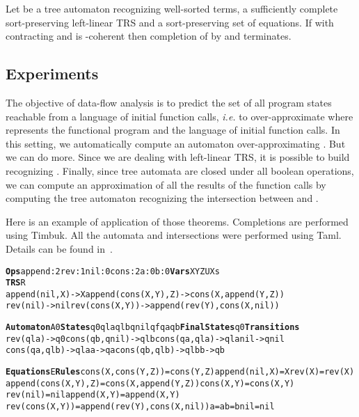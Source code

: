\documentclass[a4paper,11pt]{llncs}
\newcommand{\timbuk}{{\sf Timbuk}}
\def\timFont{\bf}
\newcommand{\Ops}{{\timFont Ops}}
\newcommand{\Vars}{{\timFont Vars}}
\newcommand{\TRS}{{\timFont TRS}}
\newcommand{\Automaton}{{\timFont Automaton}}
\newcommand{\States}{{\timFont States}}
\newcommand{\FinalStates}{{\timFont Final States}}
\newcommand{\Transitions}{{\timFont Transitions}}
\newcommand{\Equations}{{\timFont Equations}}
\newcommand{\Rules}{{\timFont Rules}}
\theoremstyle{plain}
\begin{document}
\begin{theorem}
\label{th:termSort}
Let  be a tree automaton recognizing well-sorted terms,  a sufficiently
complete sort-preserving left-linear TRS and  a sort-preserving set of
equations. If  with  contracting and  is
-coherent then completion of  by  and   
terminates.\end{theorem}

\subsection{Experiments}
\label{sec:experiments}
The objective of data-flow analysis is to predict the set of all program states
reachable from a language of initial function calls, {\em i.e. } to over-approximate
 where  represents the functional program and  the
language of initial function calls. In this setting, we automatically
compute an automaton  over-approximating . But we
can do more. Since
we are dealing with left-linear TRS, it is possible to build 
recognizing . Finally, since tree automata are closed under all boolean
operations, we can compute an approximation of all the results of the function
calls by computing the tree automaton recognizing the intersection between
 and . 

Here is an example of application of those theorems.
Completions are performed using \timbuk.
All the  automata and intersections were
performed using Taml. 
Details can be found in~\cite{GenetS-rep13}. 


{\footnotesize
\begin{alltt}
\Ops append:2 rev:1 nil:0 cons:2 a:0 b:0   \Vars X Y Z U Xs    
\TRS R
append(nil,X)->X     append(cons(X,Y),Z)->cons(X,append(Y,Z))                         
rev(nil)->nil        rev(cons(X,Y))->append(rev(Y),cons(X,nil))

\Automaton A0 \States q0 qla qlb qnil qf qa qb \FinalStates q0 \Transitions
rev(qla)->q0         cons(qb,qnil)->qlb    cons(qa,qla)->qla    nil->qnil
cons(qa,qlb)->qla    a->qa                 cons(qb,qlb)->qlb    b->qb

\Equations E \Rules    cons(X,cons(Y,Z))=cons(Y,Z)  append(nil,X)=X                             rev(X)=rev(X)   
append(cons(X,Y),Z)=cons(X,append(Y,Z))     cons(X,Y)=cons(X,Y)    
rev(nil)=nil                                append(X,Y)=append(X,Y)                     
rev(cons(X,Y))=append(rev(Y),cons(X,nil))   a=a  b=b  nil=nil                            
\end{alltt}
}
\end{document}
